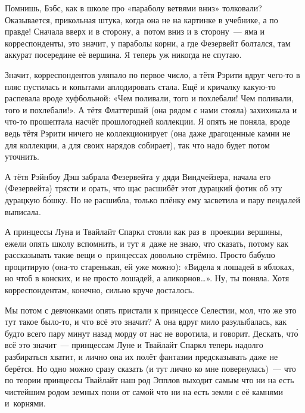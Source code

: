 \documentclass[fontsize=11pt,a5paper,titlepage=firstcover]{scrbook}
\begin{document}
Помнишь, Бэбс, как в школе про «параболу ветвями вниз» толковали? Оказывается, прикольная штука, когда она не на картинке в учебнике, а по правде! Сначала вверх и в сторону, а~потом вниз и в сторону~--- яма и корреспонденты, это значит, у параболы корни, а где Фезервейт болтался, там аккурат посередине её вершина. Я теперь уж никогда не спутаю.

Значит, корреспондентов уляпало по первое число, а тётя Рэрити вдруг чего-то в пляс пустилась и копытами аплодировать стала. Ещё и кричалку какую-то распевала вроде хуфбольной: «Чем поливали, того и похлебали! Чем поливали, того и похлебали!». А тётя Флаттершай (она рядом с нами стояла) захихикала и что-то прошептала насчёт прошлогодней коллекции. Я опять не поняла, вроде ведь тётя Рэрити ничего не коллекционирует (она даже драгоценные камни не для коллекции, а для своих нарядов собирает), так что надо будет потом уточнить.

А тётя Рэйнбоу Дэш забрала Фезервейта у дяди Виндчейзера, начала его (Фезервейта) трясти и орать, что щас расшибёт этот дурацкий фотик об эту дурацкую бо́шку. Но не расшибла, только плёнку ему засветила и пару пендалей выписала.

А принцессы Луна и Твайлайт Спаркл стояли как раз в~проекции вершины, ежели опять школу вспомнить, и тут я~даже не знаю, что сказать, потому как рассказывать такие вещи о~принцессах довольно стрёмно. Просто бабулю процитирую (она-то старенькая, ей уже можно): «Видела я лошадей в яблоках, но чтоб в конских, и не просто лошадей, а аликорнов{\ldots}». Ну, ты поняла. Хотя корреспондентам, конечно, сильно круче досталось.

Мы потом с девчонками опять пристали к принцессе Селестии, мол, что же это тут такое было-то, и что всё это значит? А она вдруг мило разулыбалась, как будто всего пару минут назад морду от нас не воротила, и говорит. Дескать, что́ всё это значит~--- принцессам Луне и Твайлайт Спаркл теперь надолго разбираться хватит, и лично она их полёт фантазии предсказывать даже не берётся. Но одно можно сразу сказать (и тут лично ко мне повернулась)~--- что по теории принцессы Твайлайт наш род Эпплов выходит самым что ни на есть чистейшим родом земных пони от самой что ни на есть земли с её камнями и~корнями.
\end{document}
